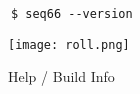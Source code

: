    \begin{verbatim}
      $ seq66 --version
   \end{verbatim}

\begin{figure}[H]
   \centering 
   \texttt{[image: roll.png]}
   \caption{Help / Build Info}
   \label{fig:seq66_menu_help_build_info}
\end{figure}

